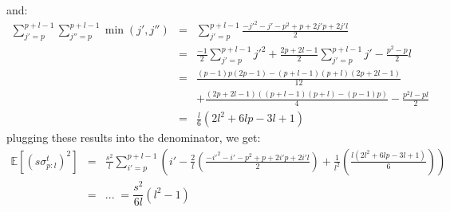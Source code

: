 \documentclass[12pt,a4paper]{article}
\newcommand{\subsvar}[2]{\sigma^t_{#1:#2}} %
\newcommand{\expectation}[1]{\mathbb{E}\left[#1\right]} %
\newcommand{\subsvarpl}{\subsvar{p}{l}} %
\begin{document}
and:
$$\begin{array}{rcl}
    \sum_{j'=p}^{p+l-1}\sum_{j''=p}^{p+l-1}\min(j',j'') & = & \sum_{j'=p}^{p+l-1}\frac{-j'^2-j'-p^2+p+2j'p+2j'l}{2} \\[8pt]
    & = & \frac{-1}{2}\sum_{j'=p}^{p+l-1}j'^2 + \frac{2p+2l-1}{2}\sum_{j'=p}^{p+l-1}j' - \frac{p^2-p}{2}l \\[8pt]
    & = & \frac{(p-1)p(2p-1)-(p+l-1)(p+l)(2p+2l-1)}{12} \\[8pt]
    && + \frac{(2p+2l-1)((p+l-1)(p+l)-(p-1)p)}{4} - \frac{p^2l-pl}{2} \\[8pt]
    & = & \frac{l}{6} \left(2 l^{2} + 6l p - 3 l + 1\right)
\end{array}$$
plugging these results into the denominator, we get:
$$\begin{array}{rcl}
    \expectation{(s\subsvarpl)^2} & = & \frac{s^2}{l}\sum_{i'=p}^{p+l-1}\left(i'-\frac{2}{l}\left(\frac{-i'^2-i'-p^2+p+2i'p+2i'l}{2}\right)+ \frac{1}{l^2}\left(\frac{l \left(2 l^{2} + 6 l p - 3 l +  1\right)}{6}\right)\right) \\[16pt]
    & = & ... \; = \dfrac{s^2}{6l} \left(l^{2} - 1\right)
\end{array}$$
\end{document}
